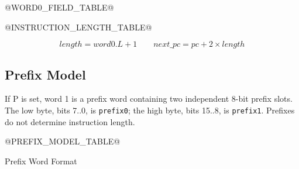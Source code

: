 @WORD0_FIELD_TABLE@

@INSTRUCTION_LENGTH_TABLE@


\[
\mathit{length} = \mathit{word0.L} + 1 \qquad
\mathit{next\_pc} = \mathit{pc} + 2 \times \mathit{length}
\]

\subsection{Prefix Model}
If P is set, word 1 is a prefix word containing two independent 8-bit prefix slots.
The low byte, bits 7..0, is \texttt{prefix0}; the high byte, bits 15..8, is
\texttt{prefix1}. Prefixes do not determine instruction length.

@PREFIX_MODEL_TABLE@

\begin{manuallistedbitdiagram}{Prefix Word Format}
\end{manuallistedbitdiagram}
